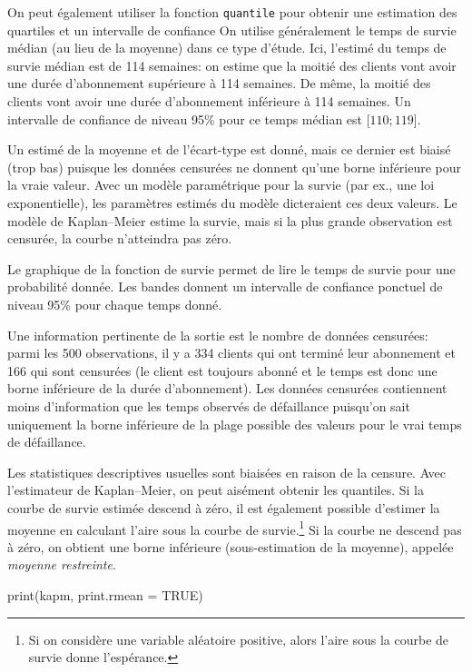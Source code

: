 \documentclass[
  11pt,
  letterpaper,
]{scrbook}
\newenvironment{Shaded}{\begin{snugshade}}{\end{snugshade}}
\newcommand{\AttributeTok}[1]{\textcolor[rgb]{0.40,0.45,0.13}{#1}}
\newcommand{\ConstantTok}[1]{\textcolor[rgb]{0.56,0.35,0.01}{#1}}
\newcommand{\FunctionTok}[1]{\textcolor[rgb]{0.28,0.35,0.67}{#1}}
\newcommand{\NormalTok}[1]{\textcolor[rgb]{0.00,0.23,0.31}{#1}}
\theoremstyle{definition}
\theoremstyle{remark}
\begin{document}
On peut également utiliser la fonction \texttt{quantile} pour obtenir
une estimation des quartiles et un intervalle de confiance On utilise
généralement le temps de survie médian (au lieu de la moyenne) dans ce
type d'étude. Ici, l'estimé du temps de survie médian est de 114
semaines: on estime que la moitié des clients vont avoir une durée
d'abonnement supérieure à 114 semaines. De même, la moitié des clients
vont avoir une durée d'abonnement inférieure à 114 semaines. Un
intervalle de confiance de niveau 95\% pour ce temps médian est
{[}\(110; 119\){]}.

Un estimé de la moyenne et de l'écart-type est donné, mais ce dernier
est biaisé (trop bas) puisque les données censurées ne donnent qu'une
borne inférieure pour la vraie valeur. Avec un modèle paramétrique pour
la survie (par ex., une loi exponentielle), les paramètres estimés du
modèle dicteraient ces deux valeurs. Le modèle de Kaplan--Meier estime
la survie, mais si la plus grande observation est censurée, la courbe
n'atteindra pas zéro.

Le graphique de la fonction de survie permet de lire le temps de survie
pour une probabilité donnée. Les bandes donnent un intervalle de
confiance ponctuel de niveau 95\% pour chaque temps donné.

Une information pertinente de la sortie est le nombre de données
censurées: parmi les 500 observations, il y a 334 clients qui ont
terminé leur abonnement et 166 qui sont censurées (le client est
toujours abonné et le temps est donc une borne inférieure de la durée
d'abonnement). Les données censurées contiennent moins d'information que
les temps observés de défaillance puisqu'on sait uniquement la borne
inférieure de la plage possible des valeurs pour le vrai temps de
défaillance.

Les statistiques descriptives usuelles sont biaisées en raison de la
censure. Avec l'estimateur de Kaplan--Meier, on peut aisément obtenir
les quantiles. Si la courbe de survie estimée descend à zéro, il est
également possible d'estimer la moyenne en calculant l'aire sous la
courbe de survie.\footnote{Si on considère une variable aléatoire
  positive, alors l'aire sous la courbe de survie donne l'espérance.} Si
la courbe ne descend pas à zéro, on obtient une borne inférieure
(sous-estimation de la moyenne), appelée \emph{moyenne restreinte}.

\begin{Shaded}
\begin{Highlighting}[]
\FunctionTok{print}\NormalTok{(kapm, }\AttributeTok{print.rmean =} \ConstantTok{TRUE}\NormalTok{)}
\end{Highlighting}
\end{Shaded}
\end{document}
